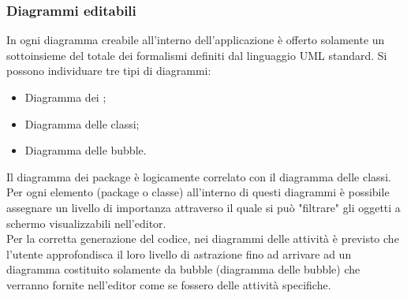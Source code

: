 \documentclass[../DefinizioneDiProdotto.tex]{subfiles}
\begin{document}
				\subsubsection{Diagrammi editabili}
					In ogni diagramma creabile all'interno dell'applicazione è offerto solamente un
					sottoinsieme del totale dei formalismi definiti dal linguaggio UML standard.
					Si possono individuare tre tipi di diagrammi:
					\begin{itemize}
						\item Diagramma dei ;
						\item Diagramma delle classi;
						\item Diagramma delle bubble.
					\end{itemize}
					Il diagramma dei package è logicamente correlato con il diagramma delle classi. Per ogni
					elemento (package o classe) all'interno di questi diagrammi è possibile assegnare un
					livello di importanza attraverso il quale si può "filtrare" gli oggetti a schermo
					visualizzabili nell'editor.\\
					Per la corretta generazione del codice, nei diagrammi delle attività è previsto che
					l'utente approfondisca il loro livello di astrazione fino ad arrivare ad un diagramma
					costituito solamente da bubble (diagramma delle bubble) che verranno fornite nell'editor
					come se fossero delle attività specifiche.
\end{document}
